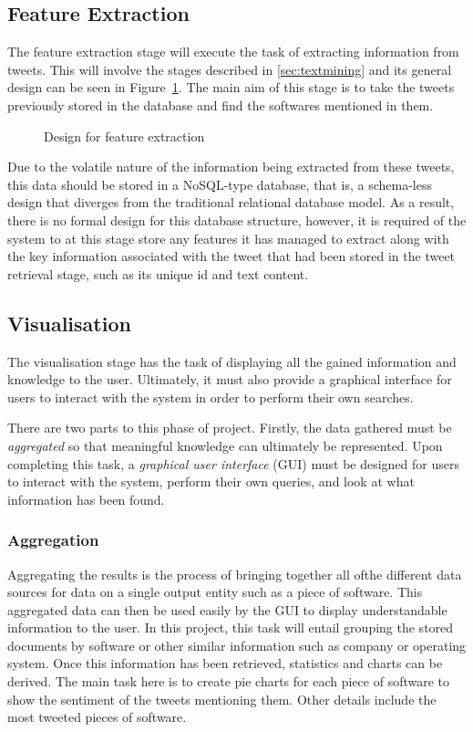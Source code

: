 \subsection{Feature Extraction}
\label{sec:arc2}
The feature extraction stage will execute the task of extracting information from tweets. This will involve the stages described in \ref{sec:textmining} and its general design can be seen in Figure~\ref{fig:phase2}. The main aim of this stage is to take the tweets previously stored in the database and find the softwares mentioned in them.

\begin{figure}[h]
  \centering
  
  \caption{Design for feature extraction
    \label{fig:phase2}}
\end{figure}

Due to the volatile nature of the information being extracted from these tweets, this data should be stored in a NoSQL-type database, that is, a schema-less design that diverges from the traditional relational database model. As a result, there is no formal design for this database structure, however, it is required of the system to at this stage store any features it has managed to extract along with the key information associated with the tweet that had been stored in the tweet retrieval stage, such as its unique id and text content.

\subsection{Visualisation}
\label{sec:arc3}
The visualisation stage has the task of displaying all the gained information and knowledge to the user. Ultimately, it must also provide a graphical interface for users to interact with the system in order to perform their own searches.

There are two parts to this phase of project. Firstly, the data gathered must be \emph{aggregated} so that meaningful knowledge can ultimately be represented. Upon completing this task, a \emph{graphical user interface} (GUI) must be designed for users to interact with the system, perform their own queries, and look at what information has been found.

\subsubsection{Aggregation}
Aggregating the results is the process of bringing together all ofthe different data sources for data on a single output entity such as a piece of software. This aggregated data can then be used easily by the GUI to display understandable information to the user. In this project, this task will entail grouping the stored documents by software or other similar information such as company or operating system. Once this information has been retrieved, statistics and charts can be derived. The main task here is to create pie charts for each piece of software to show the sentiment of the tweets mentioning them. Other details include the most tweeted pieces of software.

